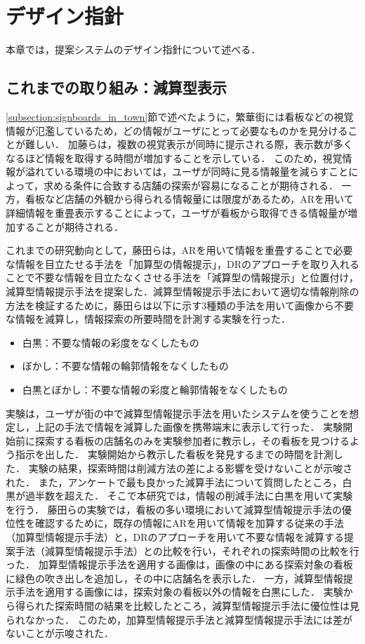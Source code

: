 \chapter{デザイン指針}
\label{chapter:design_guidline}
本章では，提案システムのデザイン指針について述べる．

\section{これまでの取り組み：減算型表示}
\label{section:dr_method}
  \ref{subsection:signboards_in_town}節で述べたように，繁華街には看板などの視覚情報が氾濫しているため，どの情報がユーザにとって必要なものかを見分けることが難しい．
  加藤らは，複数の視覚表示が同時に提示される際，表示数が多くなるほど情報を取得する時間が増加することを示している\cite{Kato:2008}．
  このため，視覚情報が溢れている環境の中においては，ユーザが同時に見る情報量を減らすことによって，求める条件に合致する店舗の探索が容易になることが期待される．
  一方，看板など店舗の外観から得られる情報量には限度があるため，ARを用いて詳細情報を重畳表示することによって，ユーザが看板から取得できる情報量が増加することが期待される．

  これまでの研究動向として，藤田らは，ARを用いて情報を重畳することで必要な情報を目立たせる手法を「加算型の情報提示」，DRのアプローチを取り入れることで不要な情報を目立たなくさせる手法を「減算型の情報提示」と位置付け，減算型情報提示手法を提案した\cite{Fujita:2013}．減算型情報提示手法において適切な情報削除の方法を検証するために，藤田らは以下に示す3種類の手法を用いて画像から不要な情報を減算し，情報探索の所要時間を計測する実験を行った．
  \begin{itemize}
    \item 白黒：不要な情報の彩度をなくしたもの
    \item ぼかし：不要な情報の輪郭情報をなくしたもの
    \item 白黒とぼかし：不要な情報の彩度と輪郭情報をなくしたもの
  \end{itemize}
  実験は，ユーザが街の中で減算型情報提示手法を用いたシステムを使うことを想定し，上記の手法で情報を減算した画像を携帯端末に表示して行った．
  実験開始前に探索する看板の店舗名のみを実験参加者に教示し，その看板を見つけるよう指示を出した．
  実験開始から教示した看板を発見するまでの時間を計測した．
  実験の結果，探索時間は削減方法の差による影響を受けないことが示唆された．
  また，アンケートで最も良かった減算手法について質問したところ，白黒が過半数を超えた．
  そこで本研究では，情報の削減手法に白黒を用いて実験を行う．
  藤田らの実験では，看板の多い環境において減算型情報提示手法の優位性を確認するために，既存の情報にARを用いて情報を加算する従来の手法（加算型情報提示手法）と，DRのアプローチを用いて不要な情報を減算する提案手法（減算型情報提示手法）との比較を行い，それぞれの探索時間の比較を行った．
  加算型情報提示手法を適用する画像は，画像の中にある探索対象の看板に緑色の吹き出しを追加し，その中に店舗名を表示した．
  一方，減算型情報提示手法を適用する画像には，探索対象の看板以外の情報を白黒にした．
  実験から得られた探索時間の結果を比較したところ，減算型情報提示手法に優位性は見られなかった．
  このため，加算型情報提示手法と減算型情報提示手法には差がないことが示唆された．

